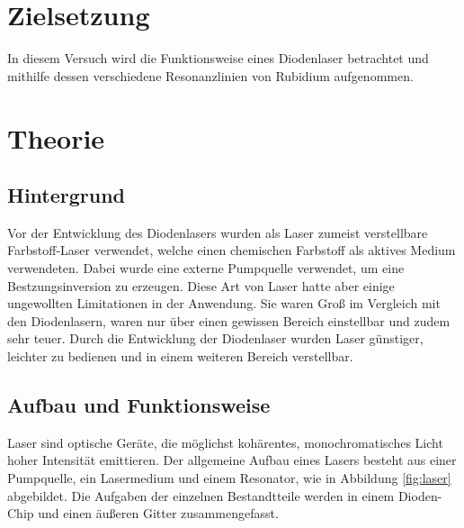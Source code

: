 \section{Zielsetzung}
\label{sec:Zielsetzung}
In diesem Versuch wird die Funktionsweise eines Diodenlaser betrachtet und
mithilfe dessen verschiedene Resonanzlinien von Rubidium aufgenommen.

\section{Theorie}
\label{sec:Theorie}

\subsection{Hintergrund}
Vor der Entwicklung des Diodenlasers wurden als Laser zumeist verstellbare Farbstoff-Laser
verwendet, welche einen chemischen Farbstoff als aktives Medium verwendeten.
Dabei wurde eine externe Pumpquelle verwendet, um eine Bestzungsinversion zu
erzeugen. Diese Art von Laser hatte aber einige ungewollten Limitationen in
der Anwendung. Sie waren Groß im Vergleich mit den Diodenlasern, waren nur über
einen gewissen Bereich einstellbar und zudem sehr teuer. Durch die Entwicklung
der Diodenlaser wurden Laser günstiger, leichter zu bedienen und in einem weiteren
Bereich verstellbar.

\subsection{Aufbau und Funktionsweise}
Laser sind optische Geräte, die möglichst kohärentes, monochromatisches Licht
hoher Intensität emittieren.
Der allgemeine Aufbau eines Lasers besteht aus einer Pumpquelle, ein Lasermedium
und einem Resonator, wie in Abbildung \ref{fig:laser} abgebildet.
Die Aufgaben der einzelnen Bestandtteile werden in einem Dioden-Chip und einen
äußeren Gitter zusammengefasst.

